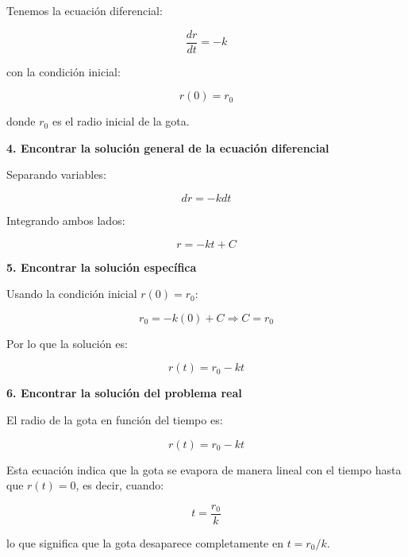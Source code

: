 \documentclass[answers]{exam}
\begin{document}
Tenemos la ecuación diferencial:

\[
	\frac{dr}{dt} = -k
\]

con la condición inicial:

\[
	r(0) = r_0
\]

donde \( r_0 \) es el radio inicial de la gota.

\vspace{0.3cm}
\textbf{4. Encontrar la solución general de la ecuación diferencial}

Separando variables:

\[
	dr = - k dt
\]

Integrando ambos lados:

\[
	r = - k t + C
\]

\vspace{0.3cm}
\textbf{5. Encontrar la solución específica}

Usando la condición inicial \( r(0) = r_0 \):

\[
	r_0 = - k (0) + C \Rightarrow C = r_0
\]

Por lo que la solución es:

\[
	r(t) = r_0 - k t
\]

\vspace{0.3cm}
\textbf{6. Encontrar la solución del problema real}

El radio de la gota en función del tiempo es:

\[
	r(t) = r_0 - k t
\]

Esta ecuación indica que la gota se evapora de manera lineal con el tiempo hasta que \( r(t) = 0 \), es decir, cuando:

\[
	t = \frac{r_0}{k}
\]

lo que significa que la gota desaparece completamente en \( t = r_0 / k \).
\end{document}
